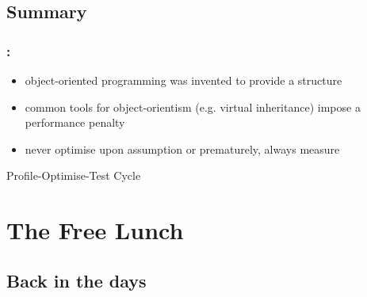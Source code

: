 \documentclass[9pt,xcolor=table]{beamer}
\begin{document}
\subsection{Summary}
\begin{frame}
\frametitle{\insertsectionhead{}: \insertsubsectionhead{}}

\begin{itemize}\large
\item object-oriented programming was invented to provide a structure
\item common tools for object-orientism (e.g. virtual inheritance) impose a performance penalty
\item never optimise upon assumption or prematurely, always measure
\end{itemize}

\begin{center}
  \huge Profile-Optimise-Test Cycle
\end{center}

\end{frame}

\section{The Free Lunch}
\subsection{Back in the days}
\end{document}
